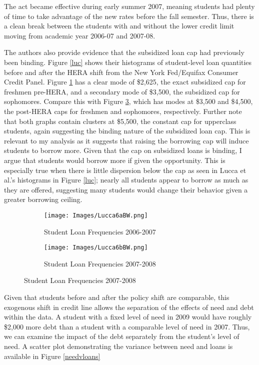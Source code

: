 \documentclass[12pt]{article}
\begin{document}
	The act became effective during early summer 2007, meaning students had plenty of time to take advantage of the new rates before the fall semester. Thus, there is a clean break between the students with and without the lower credit limit moving from academic year 2006-07 and 2007-08.
	
	The authors also provide evidence that the subsidized loan cap had previously been binding. Figure \ref{luc} shows their histograms of student-level loan quantities before and after the HERA shift from the New York Fed/Equifax Consumer Credit Panel. Figure \ref{luc06} has a clear mode of \$2,625, the exact subsidized cap for freshmen pre-HERA, and a secondary mode of \$3,500, the subsidized cap for sophomores. Compare this with Figure \ref{luc07}, which has modes at \$3,500 and \$4,500, the post-HERA caps for freshmen and sophomores, respectively. Further note that both graphs contain clusters at \$5,500, the constant cap for upperclass students, again suggesting the binding nature of the subsidized loan cap. This is relevant to my analysis as it suggests that raising the borrowing cap will induce students to borrow more. Given that the cap on subsidized loans is binding, I argue that students would borrow more if given the opportunity. This is especially true when there is little dispersion below the cap as seen in Lucca et al.'s histograms in Figure \ref{luc}; nearly all students appear to borrow as much as they are offered, suggesting many students would change their behavior given a greater borrowing ceiling.
	
	\begin{figure}
	\centering
	\caption{Student Loan Frequencies From NY Fed CCP/Equifax Panel as Presented in \textcite{lucca2018}.}
	\label{luc}
	\begin{subfigure}{0.49\textwidth}
		\centering
		\caption{Student Loan Frequencies 2006-2007}
		\label{luc06}
		\texttt{[image: Images/Lucca6aBW.png]}
	\end{subfigure} 
	\begin{subfigure}{0.49\textwidth}
		\centering
		\caption{Student Loan Frequencies 2007-2008}
		\label{luc07}
		\texttt{[image: Images/Lucca6bBW.png]}
	\end{subfigure}
	\end{figure}

	
	Given that students before and after the policy shift are comparable, this exogenous shift in credit line allows the separation of the effects of need and debt within the data. A student with a fixed level of need in 2009 would have roughly \$2,000 more debt than a student with a comparable level of need in 2007. Thus, we can examine the impact of the debt separately from the student's level of need. A scatter plot demonstrating the variance between need and loans is available in Figure \ref{needvloans}
	
\end{document}
